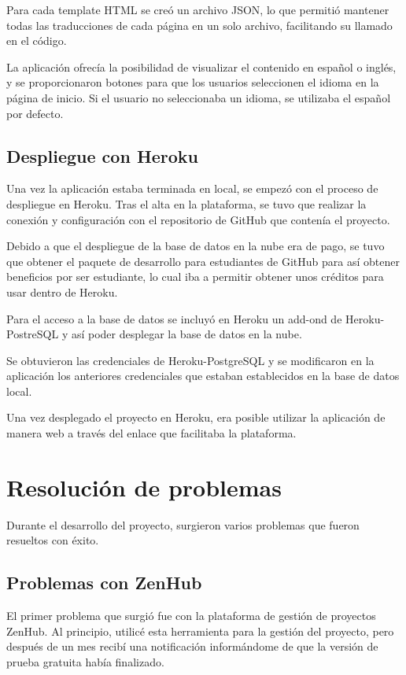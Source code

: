 Para cada template HTML se creó un archivo JSON, lo que permitió mantener todas las traducciones de cada página en un solo archivo, facilitando su llamado en el código.

La aplicación ofrecía la posibilidad de visualizar el contenido en español o inglés, y se proporcionaron botones para que los usuarios seleccionen el idioma en la página de inicio. Si el usuario no seleccionaba un idioma, se utilizaba el español por defecto.


\subsection{Despliegue con Heroku}
Una vez la aplicación estaba terminada en local, se empezó con el proceso de despliegue en Heroku. Tras el alta en la plataforma, se tuvo que realizar la conexión y configuración con el repositorio de GitHub que contenía el proyecto.

Debido a que el despliegue de la base de datos en la nube era de pago, se tuvo que obtener el paquete de desarrollo para estudiantes de GitHub para así obtener beneficios por ser estudiante, lo cual iba a permitir obtener unos créditos para usar dentro de Heroku.

Para el acceso a la base de datos se incluyó en Heroku un add-ond de Heroku-PostreSQL y así poder desplegar la base de datos en la nube. 

Se obtuvieron las credenciales de Heroku-PostgreSQL y se modificaron en la aplicación los anteriores credenciales que estaban establecidos en la base de datos local.

Una vez desplegado el proyecto en Heroku, era posible utilizar la aplicación de manera web a través del enlace que facilitaba la plataforma.

\section{Resolución de problemas}
Durante el desarrollo del proyecto, surgieron varios problemas que fueron resueltos con éxito.

\subsection{Problemas con ZenHub}
El primer problema que surgió fue con la plataforma de gestión de proyectos ZenHub. Al principio, utilicé esta herramienta para la gestión del proyecto, pero después de un mes recibí una notificación informándome de que la versión de prueba gratuita había finalizado.

